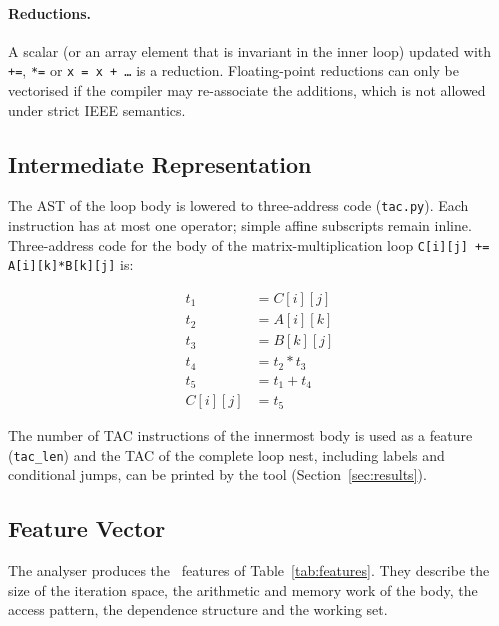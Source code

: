\paragraph{Reductions.} A scalar (or an array element that is invariant in the inner loop)
updated with \texttt{+=}, \texttt{*=} or \texttt{x = x + \dots} is a reduction. Floating-point
reductions can only be vectorised if the compiler may re-associate the additions,
which is not allowed under strict IEEE semantics.

\subsection{Intermediate Representation}

The AST of the loop body is lowered to three-address code (\texttt{tac.py}). Each
instruction has at most one operator; simple affine subscripts remain inline.
Three-address code for the body of the matrix-multiplication loop
\texttt{C[i][j] += A[i][k]*B[k][j]} is:

\begin{align}
t_1 &= C[i][j]\\
t_2 &= A[i][k]\\
t_3 &= B[k][j]\\
t_4 &= t_2 * t_3\\
t_5 &= t_1 + t_4\\
C[i][j] &= t_5
\end{align}

The number of TAC instructions of the innermost body is used as a feature
(\texttt{tac\_len}) and the TAC of the complete loop nest, including labels and
conditional jumps, can be printed by the tool (Section~\ref{sec:results}).

\subsection{Feature Vector}

The analyser produces the \numFeatures\ features of Table~\ref{tab:features}. They
describe the size of the iteration space, the arithmetic and memory work of the body,
the access pattern, the dependence structure and the working set.

